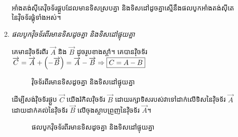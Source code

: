 \begin{enumerate}[m]
\begin{align*}
	\end{align*}
	\begin{generality}
		អាំងតង់សុីតេវុិចទ័រផ្គួបដែលមានទិសស្របគ្នា និងទិសដៅដូចគ្នាស្មើនឹងផលបូកអាំងតង់សុីតេនៃវុិចទ័រផ្គុំទាំងអស់។
	\end{generality}
	\item \emph{\kml ផលបូកវុិចទ័រពីរមានទិសដូចគ្នា និងទិសដៅផ្ទុយគ្នា}
	\begin{multicols}{2}
		គេមានវុិចទ័រពីរ $\overrightarrow{A}$ និង $\overrightarrow{B}$ ដូចរូបខាងស្តាំ។ គេបានវុិចទ័រ $\overrightarrow{C}=\overrightarrow{A}+\left(-\overrightarrow{B}\right)=\overrightarrow{A}-\overrightarrow{B}\Rightarrow\fbox{$C=A-B$}$\\
		\begin{figure}[H]
			\centering
			\caption{វុិចទ័រពីរមានទិសដូចគ្នា និងទិសដៅផ្ទុយគ្នា}
		\end{figure}
	\end{multicols}
	\begin{multicols}{2}
		ដើម្បីសង់វុិចទ័រផ្គួប $\overrightarrow{C}$ យើងរំកិលវុិចទ័រ $\overrightarrow{B}$ ដោយរក្សាទិសរបស់វាទៅដាក់លើទិសនៃវុិចទ័រ $\overrightarrow{A}$ ដោយដាក់គល់នៃវុិចទ័រ $\overrightarrow{B}$ លើចុងស្លាបព្រួញនៃវុិចទ័រ $\overrightarrow{A}$។
		\begin{figure}[H]
			\centering
			\caption{\DS ផលបូកវុិចទ័រពីរមានទិសដូចគ្នា និងទិសដៅផ្ទុយគ្នា}

\end{figure}
\end{multicols}
\end{enumerate}
